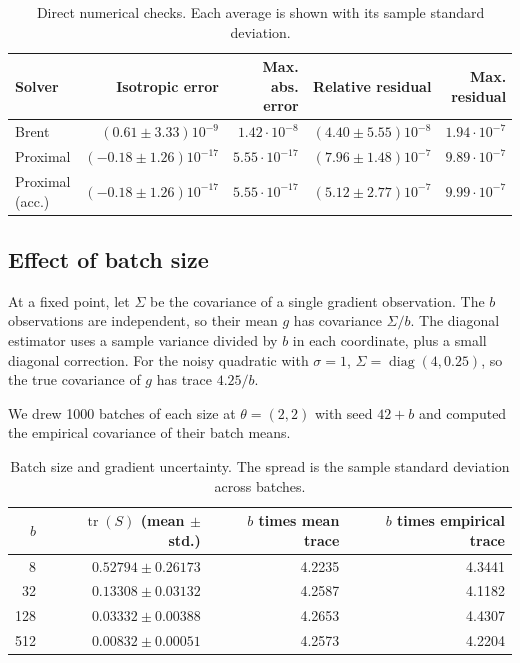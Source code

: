 \documentclass[11pt,a4paper]{article}
\begin{document}
\begin{table}[!htbp]
    \centering
    \small
    \caption{Direct numerical checks. Each average is shown with its
    sample standard deviation.}
    \label{tab:step-checks}
    \smallskip
    \begin{tabular}{lrrrr}
        \hline
        Solver & Isotropic error & Max. abs. error
        & Relative residual & Max. residual \\
        \hline
        Brent
        & $(0.61\pm3.33)10^{-9}$ & $1.42\cdot10^{-8}$
        & $(4.40\pm5.55)10^{-8}$ & $1.94\cdot10^{-7}$ \\
        Proximal
        & $(-0.18\pm1.26)10^{-17}$ & $5.55\cdot10^{-17}$
        & $(7.96\pm1.48)10^{-7}$ & $9.89\cdot10^{-7}$ \\
        Proximal (acc.)
        & $(-0.18\pm1.26)10^{-17}$ & $5.55\cdot10^{-17}$
        & $(5.12\pm2.77)10^{-7}$ & $9.99\cdot10^{-7}$ \\
        \hline
    \end{tabular}
\end{table}

\clearpage

\subsection*{Effect of batch size}

At a fixed point, let $\Sigma$ be the covariance of a single gradient
observation. The $b$ observations are independent, so their mean $g$ has
covariance $\Sigma/b$. The diagonal estimator uses a sample variance
divided by $b$ in each coordinate, plus a small diagonal correction.
For the noisy quadratic with $\sigma=1$,
$\Sigma=\operatorname{diag}(4,0.25)$, so the true covariance of $g$
has trace $4.25/b$.

We drew 1000 batches of each size at $\theta=(2,2)$ with seed
$42+b$ and computed the empirical covariance of their batch means.

\begin{table}[!htbp]
    \centering
    \small
    \caption{Batch size and gradient uncertainty. The spread is the
    sample standard deviation across batches.}
    \label{tab:batch-size-check}
    \smallskip
    \begin{tabular}{rrrr}
        \hline
        $b$ & $\operatorname{tr}(S)$ (mean $\pm$ std.)
        & $b$ times mean trace & $b$ times empirical trace \\
        \hline
        8   & $0.52794\pm0.26173$ & 4.2235 & 4.3441 \\
        32  & $0.13308\pm0.03132$ & 4.2587 & 4.1182 \\
        128 & $0.03332\pm0.00388$ & 4.2653 & 4.4307 \\
        512 & $0.00832\pm0.00051$ & 4.2573 & 4.2204 \\
        \hline
    \end{tabular}
\end{table}
\end{document}
